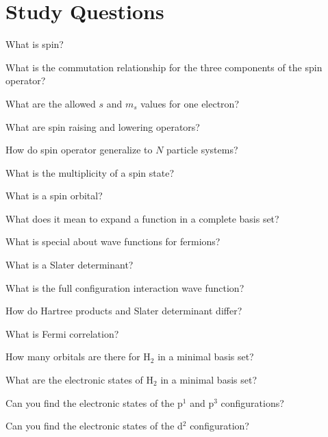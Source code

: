 \documentclass[../Main/chem532-notes.tex]{subfiles}
\begin{document}
\section*{Study Questions}
\begin{myenumerate}
\item What is spin?
\item What is the commutation relationship for the three components of the spin operator?
\item What are the allowed $s$ and $m_s$ values for one electron?
\item What are spin raising and lowering operators?
\item How do spin operator generalize to $N$ particle systems?
\item What is the multiplicity of a spin state?
\item What is a spin orbital?
\item What does it mean to expand a function in a complete basis set?
\item What is special about wave functions for fermions?
\item What is a Slater determinant?
\item What is the full configuration interaction wave function?
\item How do Hartree products and Slater determinant differ?
\item What is Fermi correlation?
\item How many orbitals are there for H$_2$ in a minimal basis set?
\item What are the electronic states of H$_2$ in a minimal basis set?
\item Can you find the electronic states of the p$^1$ and p$^3$ configurations?
\item Can you find the electronic states of the d$^2$ configuration?
\end{myenumerate}
\end{document}
